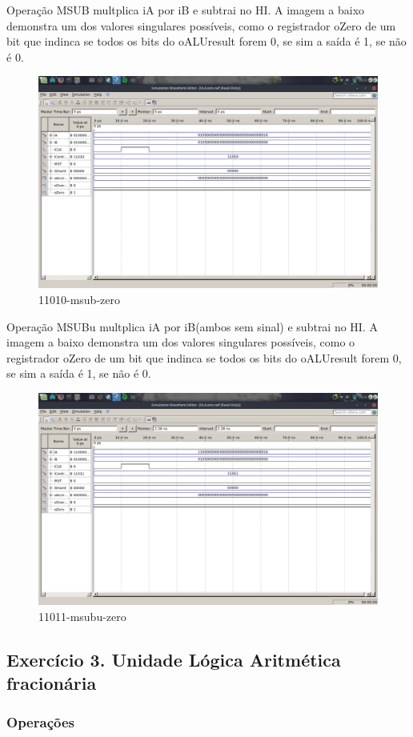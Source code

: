 \documentclass[12pt]{article}
\begin{document}
Operação MSUB multplica iA por iB e subtrai no HI.
A imagem a baixo demonstra um dos valores singulares possíveis, como o registrador oZero de um bit que indinca se todos os bits do oALUresult forem 0, se sim a saída é 1, se não é 0.
\begin{figure}[H]
	\centering
	\includegraphics[width=.8\textwidth]{11010-msub-zero.png}
	\caption{11010-msub-zero}
	\label{fig:11010-msub-zero}
\end{figure}
Operação MSUBu multplica iA por iB(ambos sem sinal) e subtrai no HI.
A imagem a baixo demonstra um dos valores singulares possíveis, como o registrador oZero de um bit que indinca se todos os bits do oALUresult forem 0, se sim a saída é 1, se não é 0.
\begin{figure}[H]
	\centering
	\includegraphics[width=.8\textwidth]{11011-msubu-zero.png}
	\caption{11011-msubu-zero}
	\label{fig:11011-msubu-zero}
\end{figure}

\subsection{Exercício 3. Unidade Lógica Aritmética fracionária}
\label{subsec:ulaint}

\subsubsection{Operações}
\label{subsubsec:2op}
\end{document}
